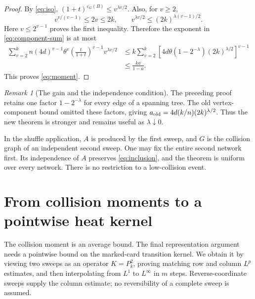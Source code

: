 \documentclass[11pt]{article}
\numberwithin{equation}{section}
\theoremstyle{definition}\newtheorem{definition}[theorem]{Definition}
\theoremstyle{remark}\newtheorem{remark}[theorem]{Remark}
\begin{document}
\begin{proof}
By \eqref{eq:iso}, $(1+t)^{e_G(B)}\le v^{\lambda v/2}$. Also, for $v\ge2$,
\[
 v^{v/(v-1)}\le2v\le2k,
 \qquad
 v^{\lambda v/2}\le(2k)^{\lambda(v-1)/2}.
\]
Here $v\le2^{v-1}$ proves the first inequality. Therefore the exponent in
\eqref{eq:component-sum} is at most
\begin{align*}
 \sum_{v=2}^k n(4d)^{v-1}\theta^v
 \left(\frac t{1+t}\right)^{v-1}v^{\lambda v/2}
 &\le k\sum_{v=2}^k
 \left[4d\theta(1-2^{-\lambda})(2k)^{\lambda/2}\right]^{v-1}\\
 &\le\frac{ka}{1-a}.
\end{align*}
This proves \eqref{eq:moment}.
\end{proof}

\begin{remark}[The gain and the independence condition]
The preceding proof retains one factor $1-2^{-\lambda}$ for every edge of
a spanning tree. The old vertex-component bound omitted these factors,
giving $a_{\rm old}=4d(k/n)(2k)^{\lambda/2}$. Thus the new theorem is stronger
and remains useful as $\lambda\downarrow0$.

In the shuffle application, $A$ is produced by the first sweep, and $G$ is
the collision graph of an independent second sweep. One may fix the entire
second network first. Its independence of $A$ preserves
\eqref{eq:inclusion}, and the theorem is uniform over every network. There
is no restriction to a low-collision event.
\end{remark}

\section{From collision moments to a pointwise heat kernel}
\label{sec:kernel}
The collision moment is an average bound.  The final representation argument
needs a pointwise bound on the marked-card transition kernel.  We obtain it by
viewing two sweeps as an operator $K=P_k^2$, proving matching row and column
$L^p$ estimates, and then interpolating from $L^1$ to $L^\infty$ in $m$
steps.  Reverse-coordinate sweeps supply the column estimate; no reversibility
of a complete sweep is assumed.
\end{document}
